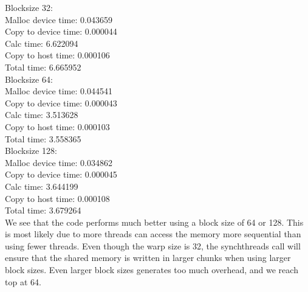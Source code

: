 \documentclass[english,a4paper,numbers=noenddot]{article}
\begin{document}
Blocksize 32:\\
Malloc device time: 0.043659\\
Copy to device time: 0.000044\\
Calc time: 6.622094\\
Copy to host time: 0.000106\\
Total time: 6.665952\\

Blocksize 64:\\
Malloc device time: 0.044541\\
Copy to device time: 0.000043\\
Calc time: 3.513628\\
Copy to host time: 0.000103\\
Total time: 3.558365\\

Blocksize 128:\\
Malloc device time: 0.034862\\
Copy to device time: 0.000045\\
Calc time: 3.644199\\
Copy to host time: 0.000108\\
Total time: 3.679264\\

We see that the code performs much better using a block size of 64 or 128. This is most likely due to more threads can access the memory more sequential than using fewer threads. Even though the warp size is 32, the synchthreads call will ensure that the shared memory is written in larger chunks when using larger block sizes. Even larger block sizes generates too much overhead, and we reach top at 64.
\end{document}
